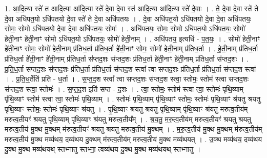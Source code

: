 \documentclass[17pt]{extarticle}
\begin{document}
1. आ॒दि॒त्या स्ते॑ त आदि॒त्या आ॑दि॒त्या स्ते॑ दे॒वा दे॒वा स्त॑ आदि॒त्या आ॑दि॒त्या स्ते॑ दे॒वाः । . ते॒ दे॒वा दे॒वा स्ते॑ ते दे॒वा अधि॑पत॒यो ऽधि॑पतयो दे॒वा स्ते॑ ते दे॒वा अधि॑पतयः । . दे॒वा अधि॑पत॒यो ऽधि॑पतयो दे॒वा दे॒वा अधि॑पतयः॒ सोमः॒ सोमो ऽधि॑पतयो दे॒वा दे॒वा अधि॑पतयः॒ सोमः॑ । . अधि॑पतयः॒ सोमः॒ सोमो ऽधि॑पत॒यो ऽधि॑पतयः॒ सोमो॑ हेती॒नाꣳ हे॑ती॒नाꣳ सोमो ऽधि॑पत॒यो ऽधि॑पतयः॒ सोमो॑ हेती॒नाम् । . अधि॑पतय॒ इत्यधि॑ - प॒त॒यः॒ । . सोमो॑ हेती॒नाꣳ हे॑ती॒नाꣳ सोमः॒ सोमो॑ हेती॒नाम् प्र॑तिध॒र्ता प्र॑तिध॒र्ता हे॑ती॒नाꣳ सोमः॒ सोमो॑ हेती॒नाम् प्र॑तिध॒र्ता । . हे॒ती॒नाम् प्र॑तिध॒र्ता प्र॑तिध॒र्ता हे॑ती॒नाꣳ हे॑ती॒नाम् प्र॑तिध॒र्ता स॑प्तद॒शः स॑प्तद॒शः प्र॑तिध॒र्ता हे॑ती॒नाꣳ हे॑ती॒नाम् प्र॑तिध॒र्ता स॑प्तद॒शः । . प्र॒ति॒ध॒र्ता स॑प्तद॒शः स॑प्तद॒शः प्र॑तिध॒र्ता प्र॑तिध॒र्ता स॑प्तद॒श स्त्वा᳚ त्वा सप्तद॒शः प्र॑तिध॒र्ता प्र॑तिध॒र्ता स॑प्तद॒श स्त्वा᳚ । . प्र॒ति॒ध॒र्तेति॑ प्रति - ध॒र्ता । . स॒प्त॒द॒श स्त्वा᳚ त्वा सप्तद॒शः स॑प्तद॒श स्त्वा॒ स्तोमः॒ स्तोम॑ स्त्वा सप्तद॒शः स॑प्तद॒श स्त्वा॒ स्तोमः॑ । . स॒प्त॒द॒श इति॑ सप्त - द॒शः । . त्वा॒ स्तोमः॒ स्तोम॑ स्त्वा त्वा॒ स्तोमः॑ पृथि॒व्याम् पृ॑थि॒व्याꣳ स्तोम॑ स्त्वा त्वा॒ स्तोमः॑ पृथि॒व्याम् । . स्तोमः॑ पृथि॒व्याम् पृ॑थि॒व्याꣳ स्तोमः॒ स्तोमः॑ पृथि॒व्याꣳ श्र॑यतु श्रयतु पृथि॒व्याꣳ स्तोमः॒ स्तोमः॑ पृथि॒व्याꣳ श्र॑यतु । . पृ॒थि॒व्याꣳ श्र॑यतु श्रयतु पृथि॒व्याम् पृ॑थि॒व्याꣳ श्र॑यतु मरुत्व॒तीय॑म् मरुत्व॒तीयꣳ॑ श्रयतु पृथि॒व्याम् पृ॑थि॒व्याꣳ श्र॑यतु मरुत्व॒तीय᳚म् । . श्र॒य॒तु॒ म॒रु॒त्व॒तीय॑म् मरुत्व॒तीयꣳ॑ श्रयतु श्रयतु मरुत्व॒तीय॑ मु॒क्थ मु॒क्थम् म॑रुत्व॒तीयꣳ॑ श्रयतु श्रयतु मरुत्व॒तीय॑ मु॒क्थम् । . म॒रु॒त्व॒तीय॑ मु॒क्थ मु॒क्थम् म॑रुत्व॒तीय॑म् मरुत्व॒तीय॑ मु॒क्थ मव्य॑थय॒ दव्य॑थय दु॒क्थम् म॑रुत्व॒तीय॑म् मरुत्व॒तीय॑ मु॒क्थ मव्य॑थयत् । . उ॒क्थ मव्य॑थय॒ दव्य॑थय दु॒क्थ मु॒क्थ मव्य॑थयथ् स्तभ्नातु स्तभ्ना॒ त्वव्य॑थय दु॒क्थ मु॒क्थ मव्य॑थयथ् स्तभ्नातु । \newline
\end{document}
